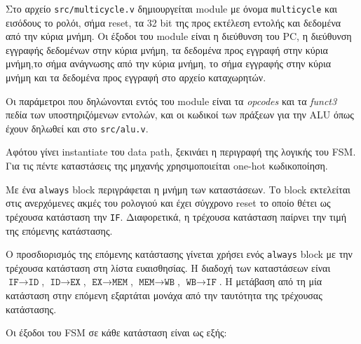 Στο αρχείο \texttt{src/multicycle.v} δημιουργείται module με όνομα \texttt{multicycle} και εισόδους το ρολόι, σήμα reset, τα 32 bit της προς εκτέλεση εντολής και δεδομένα από την κύρια μνήμη. Οι έξοδοι του module είναι η διεύθυνση του PC, η διεύθυνση εγγραφής δεδομένων στην κύρια μνήμη, τα δεδομένα προς εγγραφή στην κύρια μνήμη,το σήμα ανάγνωσης από την κύρια μνήμη, το σήμα εγγραφής στην κύρια μνήμη και τα δεδομένα προς εγγραφή στο αρχείο καταχωρητών.\par
Οι παράμετροι που δηλώνονται εντός του module είναι τα \textsl{opcodes} και τα \textsl{funct3} πεδία των υποστηριζόμενων εντολών, και οι κωδικοί των πράξεων για την ALU όπως έχουν δηλωθεί και στο \texttt{src/alu.v}.\par
Αφότου γίνει instantiate του data path, ξεκινάει η περιγραφή της λογικής του FSM. Για τις πέντε καταστάσεις της μηχανής χρησιμοποιείται one-hot κωδικοποίηση.\par
Με ένα \texttt{always} block περιγράφεται η μνήμη των καταστάσεων. Το block εκτελείται στις ανερχόμενες ακμές του ρολογιού και έχει σύγχρονο reset το οποίο θέτει ως τρέχουσα κατάσταση την \texttt{IF}. Διαφορετικά, η τρέχουσα κατάσταση παίρνει την τιμή της επόμενης κατάστασης.\par
Ο προσδιορισμός της επόμενης κατάστασης γίνεται χρήσει ενός \texttt{always} block με την τρέχουσα κατάσταση στη λίστα ευαισθησίας. Η διαδοχή των καταστάσεων είναι $\texttt{IF}\to\texttt{ID}$, $\texttt{ID}\to\texttt{EX}$, $\texttt{EX}\to\texttt{MEM}$, $\texttt{MEM}\to\texttt{WB}$, $\texttt{WB}\to\texttt{IF}$. Η μετάβαση από τη μία κατάσταση στην επόμενη εξαρτάται μονάχα από την ταυτότητα της τρέχουσας κατάστασης.\par
Οι έξοδοι του FSM σε κάθε κατάσταση είναι ως εξής:

